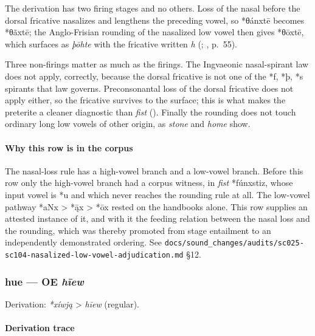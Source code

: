 \documentclass[
  british,
  a4paper,
]{article}
\begin{document}
The derivation has two firing stages and no others. Loss of the nasal
before the dorsal fricative nasalizes and lengthens the preceding vowel,
so *θánxtē becomes *θãxtē; the Anglo-Frisian rounding of the nasalized
low vowel then gives *θōxtē, which surfaces as \emph{þōhte} with the
fricative written \emph{h} (;
, p.~55).

Three non-firings matter as much as the firings. The Ingvaeonic
nasal-spirant law does not apply, correctly, because the dorsal
fricative is not one of the *f, *þ, *s spirants that law governs.
Preconsonantal loss of the dorsal fricative does not apply either, so
the fricative survives to the surface; this is what makes the preterite
a cleaner diagnostic than \emph{fist} (). Finally the rounding does not touch ordinary long low
vowels of other origin, as \emph{stone} and \emph{home} show.

\paragraph{Why this row is in the
corpus}\label{why-this-row-is-in-the-corpus-2}

The nasal-loss rule has a high-vowel branch and a low-vowel branch.
Before this row only the high-vowel branch had a corpus witness, in
\emph{fist} *fúnxstiz, whose input vowel is *u and which never reaches
the rounding rule at all. The low-vowel pathway *aNx \textgreater{} *ą̄x
\textgreater{} *ōx rested on the handbooks alone. This row supplies an
attested instance of it, and with it the feeding relation between the
nasal loss and the rounding, which was thereby promoted from stage
entailment to an independently demonstrated ordering. See
\texttt{docs/sound\_changes/audits/sc025-sc104-nasalized-low-vowel-adjudication.md}
§12.

\subsubsection{\texorpdfstring{hue --- OE
\emph{hīew}}{hue --- OE hīew}}\label{hue-oe-hux12bew}

Derivation: \emph{*xíwją} \textgreater{} \emph{hīew} (regular).

\paragraph{Derivation trace}\label{derivation-trace-81}
\end{document}
